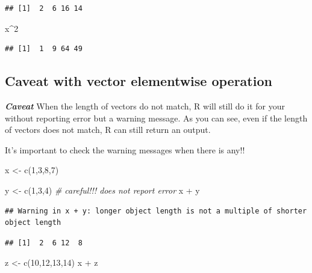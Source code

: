 \documentclass[
  11pt,
]{book}
\newenvironment{Shaded}{\begin{snugshade}}{\end{snugshade}}
\newcommand{\CommentTok}[1]{\textcolor[rgb]{0.56,0.35,0.01}{\textit{#1}}}
\newcommand{\DecValTok}[1]{\textcolor[rgb]{0.00,0.00,0.81}{#1}}
\newcommand{\FunctionTok}[1]{\textcolor[rgb]{0.00,0.00,0.00}{#1}}
\newcommand{\NormalTok}[1]{#1}
\newcommand{\OtherTok}[1]{\textcolor[rgb]{0.56,0.35,0.01}{#1}}
\newcommand{\SpecialCharTok}[1]{\textcolor[rgb]{0.00,0.00,0.00}{#1}}
\begin{document}
\begin{verbatim}
## [1]  2  6 16 14
\end{verbatim}

\begin{Shaded}
\begin{Highlighting}[]
\NormalTok{x}\SpecialCharTok{\^{}}\DecValTok{2}
\end{Highlighting}
\end{Shaded}

\begin{verbatim}
## [1]  1  9 64 49
\end{verbatim}

\hypertarget{caveat-with-vector-elementwise-operation}{%
\subsection{Caveat with vector elementwise operation}\label{caveat-with-vector-elementwise-operation}}

\textbf{\emph{Caveat}} When the length of vectors do not match, R will still do it for your without reporting error but a warning message. As you can see, even if the length of vectors does not match, R can still return an output.

It's important to check the warning messages when there is any!!

\begin{Shaded}
\begin{Highlighting}[]
\NormalTok{x }\OtherTok{\textless{}{-}} \FunctionTok{c}\NormalTok{(}\DecValTok{1}\NormalTok{,}\DecValTok{3}\NormalTok{,}\DecValTok{8}\NormalTok{,}\DecValTok{7}\NormalTok{)}

\NormalTok{y }\OtherTok{\textless{}{-}} \FunctionTok{c}\NormalTok{(}\DecValTok{1}\NormalTok{,}\DecValTok{3}\NormalTok{,}\DecValTok{4}\NormalTok{) }\CommentTok{\# careful!!! does not report error}
\NormalTok{x }\SpecialCharTok{+}\NormalTok{ y}
\end{Highlighting}
\end{Shaded}

\begin{verbatim}
## Warning in x + y: longer object length is not a multiple of shorter object length
\end{verbatim}

\begin{verbatim}
## [1]  2  6 12  8
\end{verbatim}

\begin{Shaded}
\begin{Highlighting}[]
\NormalTok{z }\OtherTok{\textless{}{-}} \FunctionTok{c}\NormalTok{(}\DecValTok{10}\NormalTok{,}\DecValTok{12}\NormalTok{,}\DecValTok{13}\NormalTok{,}\DecValTok{14}\NormalTok{)}
\NormalTok{x }\SpecialCharTok{+}\NormalTok{ z}
\end{Highlighting}
\end{Shaded}
\end{document}
